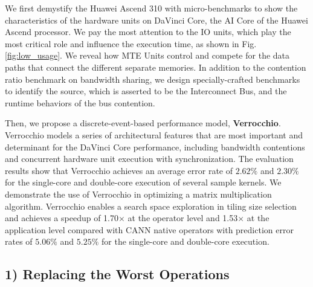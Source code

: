 \documentclass[12pt]{extbook}
\begin{document}
We first demystify the Huawei Ascend 310 with micro-benchmarks to show the characteristics of the hardware units on DaVinci Core, the AI Core of the Huawei Ascend processor. We pay the most attention to the IO units, which play the most critical role and influence the execution time, as shown in Fig. \ref{fig:low_usage}. We reveal how MTE Units control and compete for the data paths that connect the different separate memories. In addition to the contention ratio benchmark on bandwidth sharing, we design specially-crafted benchmarks to identify the source, which is asserted to be the Interconnect Bus, and the runtime behaviors of the bus contention.

Then, we propose a discrete-event-based performance model, \textbf{Verrocchio}. Verrocchio models a series of architectural features that are most important and determinant for the DaVinci Core performance, including bandwidth contentions and concurrent hardware unit execution with synchronization. The evaluation results show that Verrocchio achieves an average error rate of $2.62\%$ and $2.30\%$ for the single-core and double-core execution of several sample kernels. We demonstrate the use of Verrocchio in optimizing a matrix multiplication algorithm. Verrocchio enables a search space exploration in tiling size selection and achieves a speedup of 1.70$\times$ at the operator level and 1.53$\times$ at the application level compared with CANN \cite{CANN} native operators with prediction error rates of $5.06\%$ and $5.25\%$ for the single-core and double-core execution.

\subsection{1) Replacing the Worst Operations}
\end{document}
